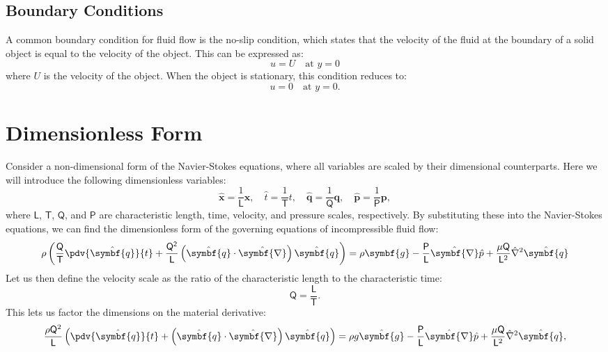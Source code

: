 \documentclass{article}
\theoremstyle{definition}
\begin{document}
\subsection{Boundary Conditions}
A common boundary condition for fluid flow is the no-slip condition,
which states that the velocity of the fluid at the boundary of a solid
object is equal to the velocity of the object. This can be expressed as:
\begin{equation*}
    u = U \quad \text{at } y = 0
\end{equation*}
where \(U\) is the velocity of the object. When the object is stationary,
this condition reduces to:
\begin{equation*}
    u = 0 \quad \text{at } y = 0.
\end{equation*}
\section{Dimensionless Form}
Consider a non-dimensional form of the Navier-Stokes equations, where
all variables are scaled by their dimensional counterparts. Here we
will introduce the following dimensionless variables:
\begin{equation*}
    \hat{\symbf{x}} = \frac{1}{\mathsf{L}} \symbf{x}, \quad \hat{t} = \frac{1}{\mathsf{T}} t, \quad \hat{\symbf{q}} = \frac{1}{\mathsf{Q}} \symbf{q}, \quad \hat{\symbf{p}} = \frac{1}{\mathsf{P}} \symbf{p},
\end{equation*}
where \(\mathsf{L}\), \(\mathsf{T}\), \(\mathsf{Q}\), and \(\mathsf{P}\)
are characteristic length, time, velocity, and pressure scales,
respectively. By substituting these into the Navier-Stokes equations,
we can find the dimensionless form of the governing equations of
incompressible fluid flow:
\begin{equation*}
    \rho \left( \frac{\mathsf{Q}}{\mathsf{T}} \pdv{\hat{\symbf{q}}}{t} + \frac{\mathsf{Q^2}}{\mathsf{L}} \left( \hat{\symbf{q}} \cdot \hat{\symbf{\nabla}} \right) \hat{\symbf{q}} \right) = \rho \symbf{g} - \frac{\mathsf{P}}{\mathsf{L}} \hat{\symbf{\nabla}} \hat{p} + \frac{\mu \mathsf{Q}}{\mathsf{L}^2} \hat{\nabla}^2 \hat{\symbf{q}}
\end{equation*}
Let us then define the velocity scale as the ratio of the characteristic
length to the characteristic time:
\begin{equation*}
    \mathsf{Q} = \frac{\mathsf{L}}{\mathsf{T}}.
\end{equation*}
This lets us factor the dimensions on the material derivative:
\begin{equation*}
    \frac{\rho \mathsf{Q}^2}{\mathsf{L}} \left( \pdv{\hat{\symbf{q}}}{t} + \left( \hat{\symbf{q}} \cdot \hat{\symbf{\nabla}} \right) \hat{\symbf{q}} \right) = \rho g \hat{\symbf{g}} - \frac{\mathsf{P}}{\mathsf{L}} \hat{\symbf{\nabla}} \hat{p} + \frac{\mu \mathsf{Q}}{\mathsf{L}^2} \hat{\nabla}^2 \hat{\symbf{q}},
\end{equation*}
\end{document}
